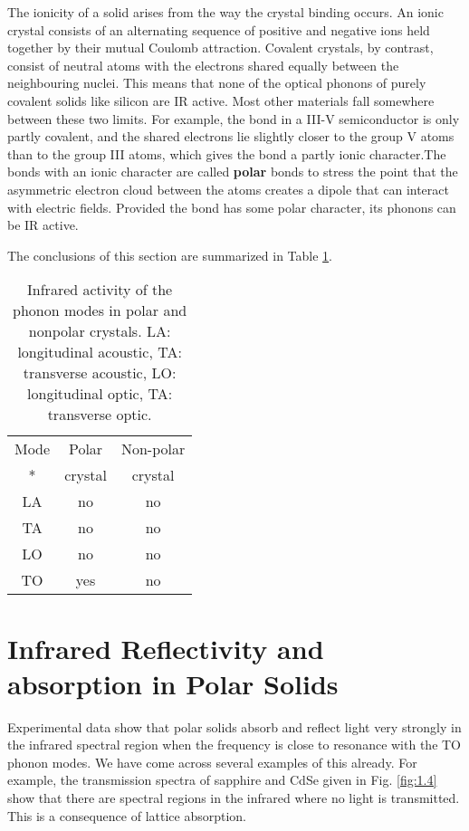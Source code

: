 \documentclass[12pt]{book}
\begin{document}
{The ionicity of a solid arises from the way the crystal binding occurs. An ionic crystal consists of an alternating sequence of positive and negative ions held together by their mutual Coulomb attraction. Covalent crystals, by contrast, consist of neutral atoms with the electrons shared equally between the neighbouring nuclei. This means that none of the optical phonons of purely covalent solids like silicon are IR active. Most other materials fall somewhere between these two limits. For example, the bond in a III-V semiconductor is only partly covalent, and the shared electrons lie slightly closer to the group V atoms than to the group III atoms, which gives the bond a partly ionic character.The bonds with an ionic character are called \textbf{polar} bonds to stress the point that the asymmetric electron cloud between the atoms creates a dipole that can interact with electric fields. Provided the bond has some polar character, its phonons can be IR active.

The conclusions of this section are summarized in Table \ref{tab:10.1}.

\begin{table}
  \centering
  \caption{Infrared activity of the phonon modes in polar and nonpolar crystals. LA: longitudinal acoustic, TA: transverse acoustic, LO: longitudinal optic, TA: transverse optic.}\label{tab:10.1}
  \begin{tabular}{ccc}
     \hline
     Mode & Polar & Non-polar \\
     * & crystal & crystal \\ \hline
     LA & no & no \\
     TA & no & no \\
     LO & no & no \\
     TO & yes & no \\
     \hline
   \end{tabular}
\end{table}


\section{Infrared Reflectivity and absorption in Polar Solids}

Experimental data show that polar solids absorb and reflect light very strongly in the infrared spectral region when the frequency is close to resonance with the TO phonon modes. We have come across several examples of this already. For example, the transmission spectra of sapphire and CdSe given in Fig. \ref{fig:1.4} show that there are spectral regions in the infrared where no light is transmitted. This is a consequence of lattice absorption.

}
\end{document}
